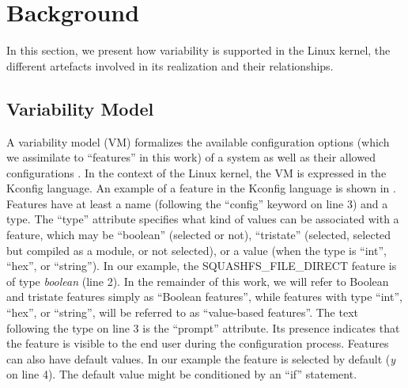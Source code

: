 
\section{Background}
\label{sec:background}


In this section, we present how variability is supported in the Linux kernel, the different artefacts involved in its realization
and their relationships.

\subsection{Variability Model} 
A variability model (VM) formalizes the available configuration options (which we assimilate to ``features'' in this work) of a system as well as their allowed configurations \citep{kang_feature-oriented_1990}.
In the context of the Linux kernel, the VM is expressed in the Kconfig language.
An example of a feature in the Kconfig language is shown in .
Features have at least a name (following the ``config'' keyword on line 3) and a type. 
The ``type'' attribute specifies what kind of values can be associated with a feature, which may be ``boolean'' (selected or not), 
``tristate'' (selected, selected but compiled as a module, or not selected), or a value (when the type is ``int'', ``hex'', or ``string''). 
In our example, the SQUASHFS\_FILE\_DIRECT feature is of type \textit{boolean} (line 2).
In the remainder of this work, we will refer to Boolean and tristate features simply as ``Boolean features'', while features with type ``int'', ``hex'', or ``string'', will be referred to as ``value-based features''.
The text following the type on line 3 is the ``prompt'' attribute. Its presence indicates that the feature is visible to the end user during the configuration process. 
Features can also have default values. In our example the feature is selected by default (\textit{y} on line 4).
The default value might be conditioned by an ``if'' statement. 

